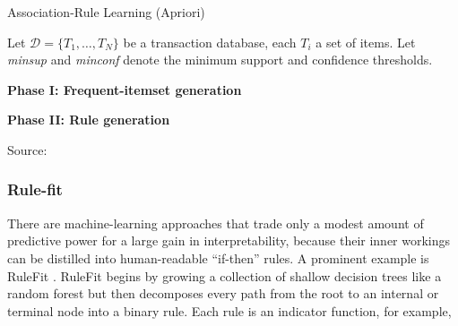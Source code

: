 \begin{algorithm}[H]
    \caption{Association-Rule Learning (Apriori)}
    \label{alg:arl_apriori}

    Let $\mathcal{D} = \{T_1,\ldots,T_N\}$ be a transaction database, each
    $T_i$ a set of items.  
    Let \textit{minsup} and \textit{minconf} denote the minimum support and confidence thresholds.

    \textbf{Phase I: Frequent-itemset generation}


    \vspace{4pt}
    \textbf{Phase II: Rule generation}


    Source: \cite{agrawal_1993}
\end{algorithm}


\subsubsection{Rule-fit}
    There are machine-learning approaches that trade only a modest amount of predictive power for a large gain in interpretability, because their inner workings can be distilled into human-readable “if-then” rules.  A prominent example is RuleFit \cite{friedman_rulefit_2018}.  RuleFit begins by growing a collection of shallow decision trees like a random forest but then decomposes every path from the root to an internal or terminal node into a binary rule.  Each rule is an indicator function, for example,
    
